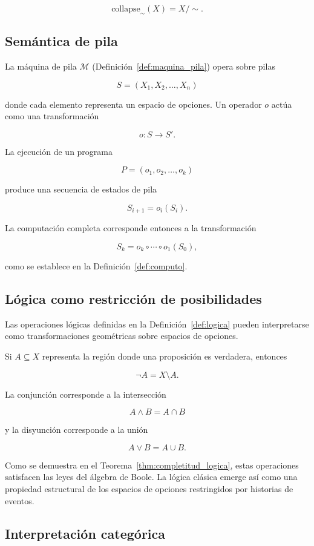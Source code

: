 \documentclass[12pt]{article}
\theoremstyle{plain}
\theoremstyle{definition}
\begin{document}
\[
\mathrm{collapse}_\sim(X) = X/{\sim}.
\]

\subsection{Semántica de pila}

La máquina de pila $\mathcal{M}$ (Definición~\ref{def:maquina_pila}) opera sobre pilas

\[
S = (X_1, X_2, \ldots, X_n)
\]

donde cada elemento representa un espacio de opciones. Un operador $o$ actúa como una transformación

\[
o : S \rightarrow S'.
\]

La ejecución de un programa

\[
P = (o_1, o_2, \ldots, o_k)
\]

produce una secuencia de estados de pila

\[
S_{i+1} = o_i(S_i).
\]

La computación completa corresponde entonces a la transformación

\[
S_k = o_k \circ \cdots \circ o_1(S_0),
\]

como se establece en la Definición~\ref{def:computo}.

\subsection{Lógica como restricción de posibilidades}

Las operaciones lógicas definidas en la Definición~\ref{def:logica} pueden interpretarse como transformaciones geométricas sobre espacios de opciones.

Si $A \subseteq X$ representa la región donde una proposición es verdadera, entonces

\[
\neg A = X \setminus A.
\]

La conjunción corresponde a la intersección

\[
A \land B = A \cap B
\]

y la disyunción corresponde a la unión

\[
A \lor B = A \cup B .
\]

Como se demuestra en el Teorema~\ref{thm:completitud_logica}, estas operaciones satisfacen las leyes del álgebra de Boole. La lógica clásica emerge así como una propiedad estructural de los espacios de opciones restringidos por historias de eventos.

\subsection{Interpretación categórica}
\end{document}
